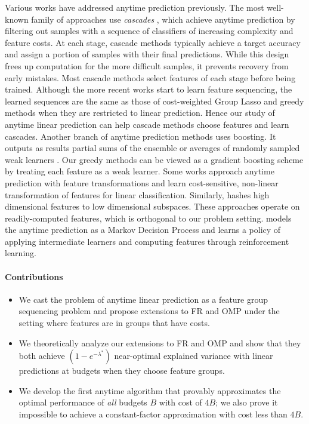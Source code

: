 Various works have addressed anytime prediction previously. 
The most well-known family of approaches 
use \textit{cascades} \citep{cascade}, which achieve 
anytime prediction by filtering out samples 
with a sequence of classifiers of increasing complexity 
and feature costs. 
At each stage, cascade methods 
\citep{sochman:05, brubaker:07, lefakis:10, xu:14, cai:15} 
typically achieve a target accuracy and assign a portion of samples
with their final predictions. While this design frees up computation for 
the more difficult samples, it prevents recovery from early 
mistakes. Most cascade methods select features of each 
stage before being trained. Although the more recent works start to learn feature sequencing, the learned sequences
are the same as those of cost-weighted Group Lasso \citep{chen:12} 
and greedy methods \citep{cai:15} when they are 
restricted to linear prediction. Hence our study of anytime 
linear prediction can help cascade methods choose features and
learn cascades. 
Another branch of anytime prediction methods uses boosting. It outputs as results partial sums of the ensemble \citep{speedboost} or averages of randomly sampled weak learners \citep{reyzin:11}. Our greedy methods can be 
viewed as a gradient boosting scheme by treating each feature 
as a weak learner. 
Some works approach anytime prediction with feature transformations \citep{xu:12, xu:13b} and learn cost-sensitive, non-linear transformation of features for linear classification. Similarly, \cite{weinberger09feature} hashes high dimensional features to low dimensional subspaces. These approaches operate on readily-computed features, which is orthogonal to our problem setting. 
\cite{timeliness} models the anytime prediction as a Markov Decision Process and learns a policy of applying intermediate learners and computing features through reinforcement learning.

\paragraph*{Contributions}
\begin{itemize}[leftmargin=*]
\setlength\itemsep{1em}
\item We cast the problem of anytime linear prediction 
as a feature group sequencing problem  
and propose extensions to FR and OMP under the setting where features are in
groups that have costs. 
\item We theoretically analyze our extensions to FR and OMP 
and show that they both achieve $(1-e^{-\lambda^*})$ near-optimal 
explained variance with linear predictions at budgets when 
they choose feature groups.
\item We develop the first anytime algorithm 
that provably approximates the optimal performance
of \textit{all} budgets $B$ with cost of $4B$; we also prove it 
impossible to achieve a constant-factor approximation with cost less than $4B$. 
\end{itemize}






